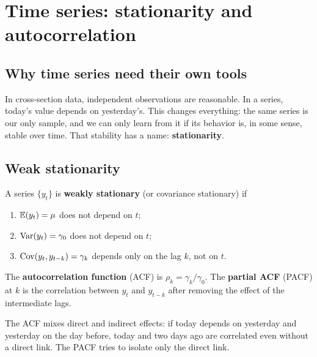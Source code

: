 \chapter{Time series: stationarity and autocorrelation}
\label{cap:est}

\section{Why time series need their own tools}
In cross-section data, independent observations are reasonable. In a series, today's value depends on yesterday's. This changes everything: the same series is our only sample, and we can only learn from it if its behavior is, in some sense, stable over time. That stability has a name: \textbf{stationarity}.

\section{Weak stationarity}
A series $\{y_t\}$ is \textbf{weakly stationary} (or covariance stationary) if
\begin{enumerate}[leftmargin=1.6em]
\item $\mathbb{E}(y_t)=\mu$ does not depend on $t$;
\item $\operatorname{Var}(y_t)=\gamma_0$ does not depend on $t$;
\item $\operatorname{Cov}(y_t,y_{t-k})=\gamma_k$ depends only on the lag $k$, not on $t$.
\end{enumerate}
The \textbf{autocorrelation function} (ACF) is $\rho_k=\gamma_k/\gamma_0$. The \textbf{partial ACF} (PACF) at $k$ is the correlation between $y_t$ and $y_{t-k}$ after removing the effect of the intermediate lags.

\begin{intuicao}
The ACF mixes direct and indirect effects: if today depends on yesterday and yesterday on the day before, today and two days ago are correlated even without a direct link. The PACF tries to isolate only the direct link.
\end{intuicao}

